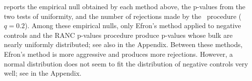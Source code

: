 \documentclass[a4paper,11pt]{article}
\theoremstyle{plain}
\theoremstyle{definition}
\def\calI{\mathcal{I}}
\theoremstyle{plain}
\newcommand{\nickname}{{\text{RANC}}}
\newcommand{\hypothesisIndex}[1]{{\calI_{#1}}}
\newcommand{\FDR}{\text{FDR}}
\newcommand{\FDRLevel}{q}
\newcommand{\BH}{{\text{BH}}}
\newcommand{\logTMT}{{$\log$ TMT}}
\begin{document}
 reports the empirical null obtained by each
method above, the p-values from the two tests of uniformity, and the
number of rejections made by the \BH~procedure ($q = 0.2$). Among
these empirical nulls, only Efron's method applied to
negative controls and the RANC p-values procedure produce p-values
whose bulk are nearly uniformly distributed; see also
 in the Appendix. Between these methods,
Efron's method is more aggressive and produces more
rejections. However, a normal distribution does not seem to fit the
distribution of negative controls very well; see 
in the Appendix.




\end{document}
